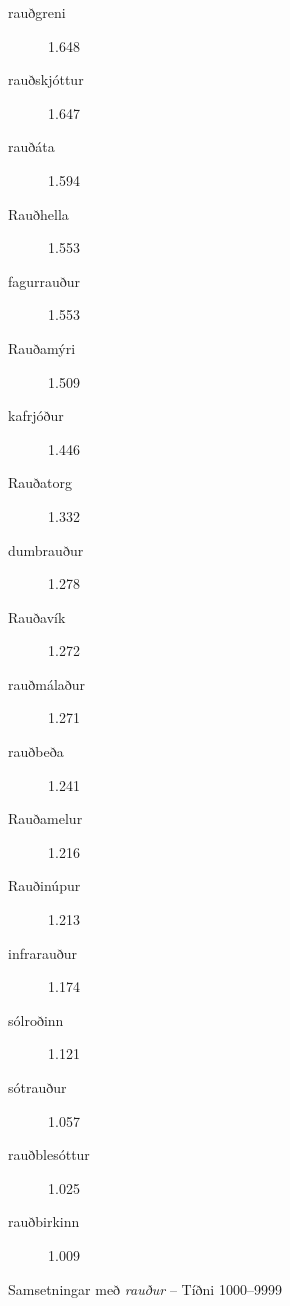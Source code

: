 \documentclass[../samsetningasafn.tex]{subfiles}
\begin{document}
\begin{bigwordlist}
\begin{footnotesize}
\begin{multicols}{4}
\begin{description}
		\item [rauðgreni]		1.648	
		\item [rauðskjóttur]		1.647	
		\item [rauðáta]		1.594	
		\item [Rauðhella]		1.553	
		\item [fagurrauður]		1.553	
		\item [Rauðamýri]		1.509	
		\item [kafrjóður]		1.446	
		\item [Rauðatorg]		1.332	
		\item [dumbrauður]		1.278	
		\item [Rauðavík]	1.272	
		\item [rauðmálaður]		1.271
		\item [rauðbeða]	1.241
		\item [Rauðamelur]		1.216
		\item [Rauðinúpur]	1.213
		\item [infrarauður]		1.174
		\item [sólroðinn]		1.121
		\item [sótrauður]		1.057
		\item [rauðblesóttur]		1.025
		\item [rauðbirkinn]		1.009
	\end{description}
\end{multicols}
\end{footnotesize}
	
\label{listi:raud9999}
\caption{Samsetningar með \textit{rauður} -- Tíðni 1000--9999}
\end{bigwordlist}

\end{document}
